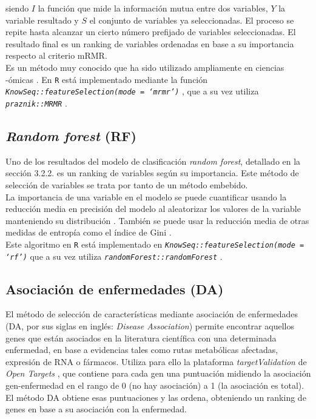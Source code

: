 siendo $I$ la función que mide la información mutua entre dos variables, $Y$ la variable resultado y $S$ el conjunto de variables ya seleccionadas. El proceso se repite hasta alcanzar un cierto número prefijado de variables seleccionadas. El resultado final es un ranking de variables ordenadas en base a su importancia respecto al criterio mRMR.\\

Es un método muy conocido que ha sido utilizado ampliamente en ciencias -ómicas \cite{Ding2005, Yang2013, Galvez2018, Castillo2019, Galvez2020}. En \texttt{R}  está implementado mediante la función \textit{\texttt{KnowSeq::\linebreak featureSelection(mode = `mrmr')}} \cite{KnowSeq}, que a su vez utiliza \textit{\texttt{praznik::MRMR} \cite{Kursa2020}}.

\subsection{\textit{Random forest} (RF)}

Uno de los resultados del modelo de clasificación \textit{random forest}, detallado en la sección 3.2.2. es un ranking de variables según su importancia. Este método de selección de variables se trata por tanto de un método embebido.\\

La importancia de una variable en el modelo se puede cuantificar usando la reducción media en precisión del modelo al aleatorizar los valores de la variable manteniendo su distribución \cite{Breiman2001, Breiman2002}. También se puede usar la reducción media de otras medidas de entropía como el índice de Gini \cite{Louppe2013}.\\

Este algoritmo en \texttt{R}  está implementado en \textit{\texttt{KnowSeq::featureSelection(mode = `rf')}} \cite{KnowSeq} que a su vez utiliza \textit{\texttt{randomForest::randomForest}} \cite{Liaw2002}.

\subsection{Asociación de enfermedades (DA)}

El método de selección de características mediante asociación de enfermedades (DA, por sus siglas en inglés: \textit{Disease Association}) permite encontrar aquellos genes que están asociados en la literatura científica con una determinada enfermedad, en base a evidencias tales como rutas metabólicas afectadas, expresión de RNA o fármacos. Utiliza para ello la plataforma \textit{targetValidation} de \textit{Open Targets} \cite{OpenTargets2020}, que contiene para cada gen una puntuación midiendo la asociación gen-enfermedad en el rango de 0 (no hay asociación) a 1 (la asociación es total). El método DA obtiene esas puntuaciones y las ordena, obteniendo un ranking de genes en base a su asociación con la enfermedad.\\

